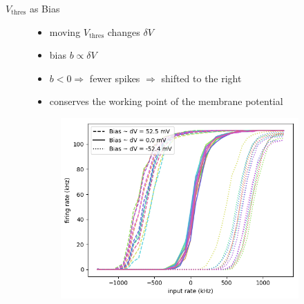 \documentclass[12pt, aspectratio=169]{beamer}
\begin{document}
\begin{frame}{$V_{\text{thres}}$ as Bias}
    \begin{figure}[!htb]
            \begin{itemize}
                \item moving $V_{\text{thres}}$ changes $\delta V$
                \item bias $b \propto \delta V $\\
                \item $b < 0 \Rightarrow $ fewer spikes $\Rightarrow$ shifted to the right
                
                \item conserves the working point of the membrane potential
            \end{itemize}
      	\endminipage\hfill
            \centering
            \vspace{20pt}
            \begin{figure}
                \includegraphics[scale=0.5]{mfp/bias_for_activation_function.png}
                \label{membrane_potential}
            \end{figure}
        \endminipage\hfill
    \end{figure}
\end{frame}

\end{document}
